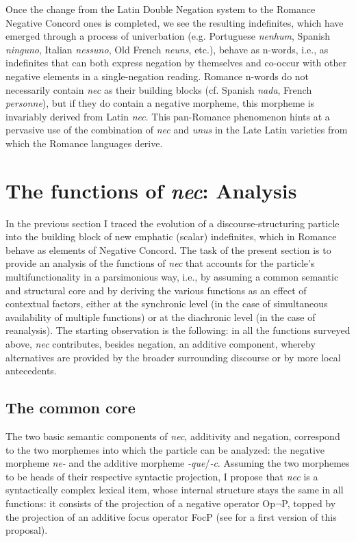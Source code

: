 \documentclass[output=paper]{langsci/langscibook}
\begin{document}
\noindent Once the change from the Latin Double Negation system to the Romance Negative Concord ones is completed, we see the resulting indefinites, which have emerged through a process of univerbation (e.g. Portuguese {\emph{nenhum}}, Spanish {\emph{ninguno}}, Italian {\emph{nessuno}}, Old French {\emph{neuns}}, etc.), behave as n-words, i.e., as indefinites that can both express negation by themselves and co-occur with other negative elements in a single-negation reading. Romance n-words do not necessarily contain {\emph{nec}} as their building blocks (cf. Spanish {\emph{nada}}, French {\emph{personne}}), but if they do contain a negative morpheme, this morpheme is invariably derived from Latin {\emph{nec}}. This pan-Romance phenomenon hints at a pervasive use of the combination of {\emph{nec}} and {\emph{unus}} in the Late Latin varieties from which the Romance languages derive.

\section{The functions of {\emph{nec}}: Analysis} \label{sectionanalysis}

In the previous section I traced the evolution of a discourse-structuring particle into the building block of new emphatic (scalar) indefinites, which in Romance behave as elements of Negative Concord. The task of the present section is to provide an analysis of the functions of {\emph{nec}} that accounts for the particle's multifunctionality in a parsimonious way, i.e., by assuming a common semantic and structural core and by deriving the various functions as an effect of contextual factors, either at the synchronic level (in the case of simultaneous availability of multiple functions) or at the diachronic level (in the case of reanalysis). The starting observation is the following: in all the functions surveyed above, {\emph{nec}} contributes, besides negation, an additive component, whereby alternatives are provided by the broader surrounding discourse or by more local antecedents.

\subsection{The common core}

The two basic semantic components of {\emph{nec}}, additivity and negation, correspond to the two morphemes into which the particle can be analyzed: the negative morpheme {\emph{ne-}} and the additive morpheme {\emph{-que}}/{\emph{-c}}. Assuming the two morphemes to be heads of their respective syntactic projection, I propose that {\emph{nec}} is a syntactically complex lexical item, whose internal structure stays the same in all functions: it consists of the projection of a negative operator Op$\lnot$P, topped by the projection of an additive focus operator FocP (see \citealt[]{Gianollo17} for a first version of this proposal).
\end{document}
